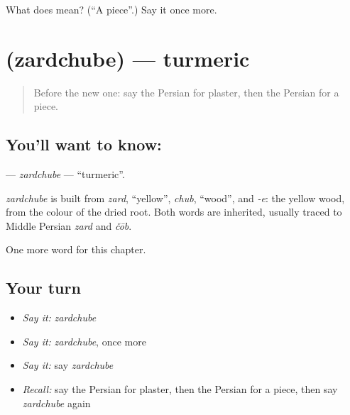\begin{tcolorbox}[breakable,colback=teal!4,colframe=teal!35!black,title={Before you move on}]
What does  mean? (\textquotedblleft{}A piece\textquotedblright{}.) Say it once more.
\end{tcolorbox}
\section[\texorpdfstring{\fa{زردچوبه} (zardchube)}{زردچوبه (zardchube)}]{ (zardchube) — turmeric}

\label{lesson:FA-C249-zardchube}



\begin{quote}
Before the new one: say the Persian for plaster, then the Persian for a piece.
\end{quote}

\subsection*{You'll want to know: }
\textbf{} — \emph{zardchube} — \textquotedblleft{}turmeric\textquotedblright{}.

\begin{cousinweb}
\emph{zardchube} is built from \emph{zard}, \textquotedblleft{}yellow\textquotedblright{}, \emph{chub}, \textquotedblleft{}wood\textquotedblright{}, and \emph{-e}: the yellow wood, from the colour of the dried root. Both words are inherited, usually traced to Middle Persian \emph{zard} and \emph{čōb}.
\end{cousinweb}

\begin{grammarlens}[title={What you've built}]
One more word for this chapter.
\end{grammarlens}

\subsection*{Your turn}
\begin{itemize}
\raggedright
  \item \emph{Say it:} \emph{zardchube}
  \item \emph{Say it:} \emph{zardchube}, once more
  \item \emph{Say it:} say \emph{zardchube}
  \item \emph{Recall:} say the Persian for plaster, then the Persian for a piece, then say \emph{zardchube} again
\end{itemize}

